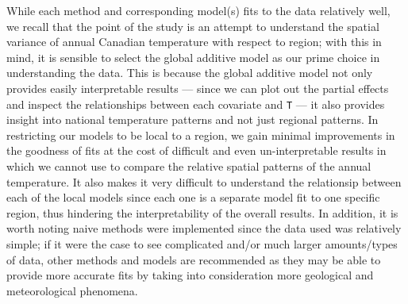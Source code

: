 \documentclass[aoas]{imsart}\usepackage[]{graphicx}\usepackage[]{xcolor}
\begin{document}
While each method and corresponding model(s) fits to the data relatively well, we recall that the point of the study is an attempt to understand the spatial variance of annual Canadian temperature with respect to region; with this in mind, it is sensible to select the global additive model as our prime choice in understanding the data. This is because the global additive model not only provides easily interpretable results --- since we can plot out the partial effects and inspect the relationships between each covariate and \texttt{T} --- it also provides insight into national temperature patterns and not just regional patterns. In restricting our models to be local to a region, we gain minimal improvements in the goodness of fits at the cost of difficult and even un-interpretable results in which we cannot use to compare the relative spatial patterns of the annual temperature. It also makes it very difficult to understand the relationsip between each of the local models since each one is a separate model fit to one specific region, thus hindering the interpretability of the overall results. In addition, it is worth noting naive methods were implemented since the data used was relatively simple; if it were the case to see complicated and/or much larger amounts/types of data, other methods and models are recommended as they may be able to provide more accurate fits by taking into consideration more geological and meteorological phenomena.

\newpage



\end{document}
